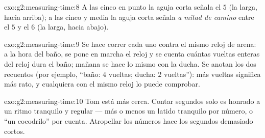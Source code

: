 \begin{solution}{exo:g2:measuring-time:8}
A las cinco en punto la aguja corta señala el $5$ (la larga, hacia
arriba); a las cinco y media la aguja corta señala \emph{a mitad de
camino} entre el $5$ y el $6$ (la larga, hacia abajo).
\end{solution}

\begin{solution}{exo:g2:measuring-time:9}
Se hace correr cada uno contra el mismo reloj de arena: a la hora del
baño, se pone en marcha el reloj y se cuenta cuántas vueltas enteras
del reloj dura el baño; mañana se hace lo mismo con la ducha. Se
anotan los dos recuentos (por ejemplo, ``baño: $4$ vueltas; ducha: $2$
vueltas''): más vueltas significa más rato, y cualquiera con el mismo
reloj lo puede comprobar.
\end{solution}

\begin{solution}{exo:g2:measuring-time:10}
Tom está más cerca. Contar segundos solo es honrado a un ritmo
tranquilo y regular --- más o menos un latido tranquilo por número, o
``un cocodrilo'' por cuenta. Atropellar los números hace los segundos
demasiado cortos.
\end{solution}
